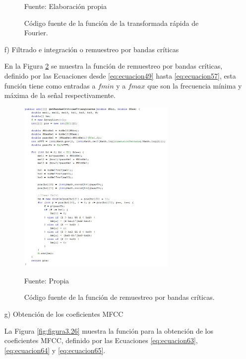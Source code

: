 \begin{enumerate}
\begin{figure}[H]
\begin{center}
\end{center}
\begin{center}
\vskip -0.5cm
\caption{\small{Código fuente de la función de la transformada rápida de Fourier.}}
\label{fig:figura3.23}
{\small{Fuente: Elaboración propia}}
\end{center}
\end{figure}
\vskip -0.5cm
\item[f)]Filtrado e integración o remuestreo por bandas críticas
\par
En la Figura \ref{fig:figura3.25} se muestra la función de remuestreo por bandas críticas, definido por las Ecuaciones desde \eqref{eq:ecuacion49} hasta \eqref{eq:ecuacion57}, esta función tiene como entradas a $fmin$ y a $fmax$ que son la frecuencia mínima y máxima de la señal respectivamente.
\begin{figure}[H]
\captionsetup{justification=centering}
\begin{center}
\includegraphics[width=0.72\textwidth]{Imagenes/Cap3/image025}
\end{center}
\begin{center}
\vskip -0.5cm
\caption{\small{Código fuente de la función de remuestreo por bandas críticas.}}
\label{fig:figura3.25}
{\small{Fuente: Propia}}
\end{center}
\end{figure}
\newpage
\item[g)]Obtención de los coeficientes MFCC
\par
La Figura \ref{fig:figura3.26} muestra la función para la obtención de los coeficientes MFCC, definido por las Ecuaciones \eqref{eq:ecuacion63}, \eqref{eq:ecuacion64} y \eqref{eq:ecuacion65}.

\end{enumerate}
